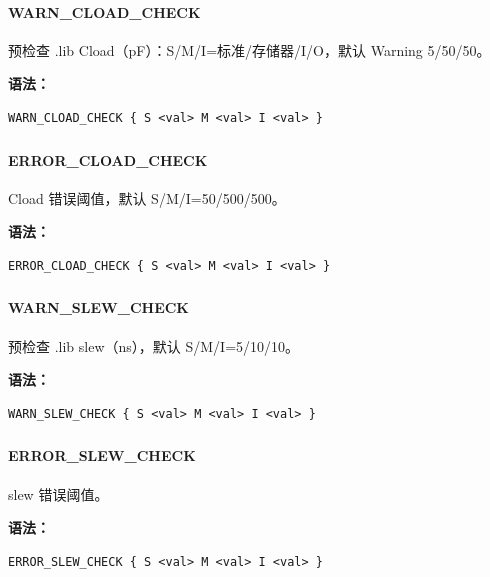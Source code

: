\paragraph*{WARN_CLOAD_CHECK}

预检查 .lib Cload（pF）：S/M/I=标准/存储器/I/O，默认 Warning 5/50/50。

\textbf{语法：}
\begin{lstlisting}
WARN_CLOAD_CHECK { S <val> M <val> I <val> }
\end{lstlisting}

\subsubsection{}
\paragraph*{ERROR_CLOAD_CHECK}

Cload 错误阈值，默认 S/M/I=50/500/500。

\textbf{语法：}
\begin{lstlisting}
ERROR_CLOAD_CHECK { S <val> M <val> I <val> }
\end{lstlisting}

\subsubsection{}
\paragraph*{WARN_SLEW_CHECK}

预检查 .lib slew（ns），默认 S/M/I=5/10/10。

\textbf{语法：}
\begin{lstlisting}
WARN_SLEW_CHECK { S <val> M <val> I <val> }
\end{lstlisting}

\subsubsection{}
\paragraph*{ERROR_SLEW_CHECK}

slew 错误阈值。

\textbf{语法：}
\begin{lstlisting}
ERROR_SLEW_CHECK { S <val> M <val> I <val> }
\end{lstlisting}

